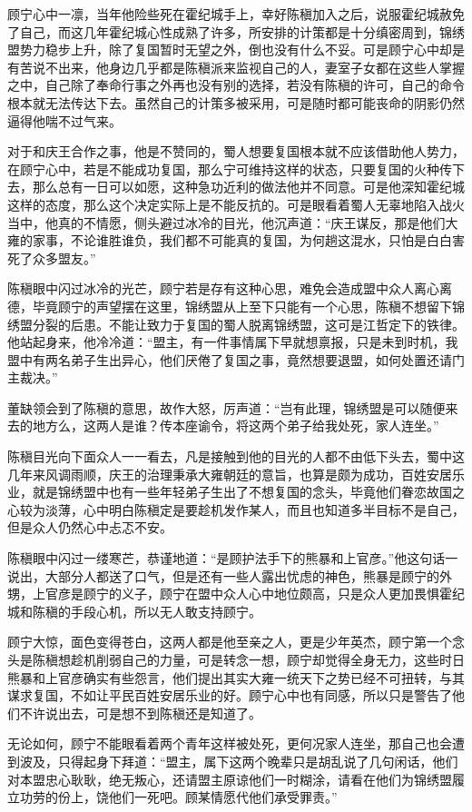 顾宁心中一凛，当年他险些死在霍纪城手上，幸好陈稹加入之后，说服霍纪城赦免了自己，而这几年霍纪城心性成熟了许多，所安排的计策都是十分缜密周到，锦绣盟势力稳步上升，除了复国暂时无望之外，倒也没有什么不妥。可是顾宁心中却是有苦说不出来，他身边几乎都是陈稹派来监视自己的人，妻室子女都在这些人掌握之中，自己除了奉命行事之外再也没有别的选择，若没有陈稹的许可，自己的命令根本就无法传达下去。虽然自己的计策多被采用，可是随时都可能丧命的阴影仍然逼得他喘不过气来。

对于和庆王合作之事，他是不赞同的，蜀人想要复国根本就不应该借助他人势力，在顾宁心中，若是不能成功复国，那么宁可维持这样的状态，只要复国的火种传下去，那么总有一日可以如愿，这种急功近利的做法他并不同意。可是他深知霍纪城这样的态度，那么这个决定实际上是不能反抗的。可是眼看着蜀人无辜地陷入战火当中，他真的不情愿，侧头避过冰冷的目光，他沉声道：“庆王谋反，那是他们大雍的家事，不论谁胜谁负，我们都不可能真的复国，为何趟这混水，只怕是白白害死了众多盟友。”

陈稹眼中闪过冰冷的光芒，顾宁若是存有这种心思，难免会造成盟中众人离心离德，毕竟顾宁的声望摆在这里，锦绣盟从上至下只能有一个心思，陈稹不想留下锦绣盟分裂的后患。不能让致力于复国的蜀人脱离锦绣盟，这可是江哲定下的铁律。他站起身来，他冷冷道：“盟主，有一件事情属下早就想禀报，只是未到时机，我盟中有两名弟子生出异心，他们厌倦了复国之事，竟然想要退盟，如何处置还请门主裁决。”

董缺领会到了陈稹的意思，故作大怒，厉声道：“岂有此理，锦绣盟是可以随便来去的地方么，这两人是谁？传本座谕令，将这两个弟子给我处死，家人连坐。”

陈稹目光向下面众人一一看去，凡是接触到他的目光的人都不由低下头去，蜀中这几年来风调雨顺，庆王的治理秉承大雍朝廷的意旨，也算是颇为成功，百姓安居乐业，就是锦绣盟中也有一些年轻弟子生出了不想复国的念头，毕竟他们眷恋故国之心较为淡薄，心中明白陈稹定是要趁机发作某人，而且也知道多半目标不是自己，但是众人仍然心中忐忑不安。

陈稹眼中闪过一缕寒芒，恭谨地道：“是顾护法手下的熊暴和上官彦。”他这句话一说出，大部分人都送了口气，但是还有一些人露出忧虑的神色，熊暴是顾宁的外甥，上官彦是顾宁的义子，顾宁在盟中众人心中地位颇高，只是众人更加畏惧霍纪城和陈稹的手段心机，所以无人敢支持顾宁。

顾宁大惊，面色变得苍白，这两人都是他至亲之人，更是少年英杰，顾宁第一个念头是陈稹想趁机削弱自己的力量，可是转念一想，顾宁却觉得全身无力，这些时日熊暴和上官彦确实有些怨言，他们提出其实大雍一统天下之势已经不可扭转，与其谋求复国，不如让平民百姓安居乐业的好。顾宁心中也有同感，所以只是警告了他们不许说出去，可是想不到陈稹还是知道了。

无论如何，顾宁不能眼看着两个青年这样被处死，更何况家人连坐，那自己也会遭到波及，只得起身下拜道：“盟主，属下这两个晚辈只是胡乱说了几句闲话，他们对本盟忠心耿耿，绝无叛心，还请盟主原谅他们一时糊涂，请看在他们为锦绣盟履立功劳的份上，饶他们一死吧。顾某情愿代他们承受罪责。”

